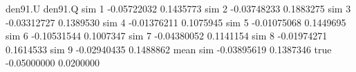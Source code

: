 \begin{Schunk}
\begin{Soutput}
             den91.U   den91.Q
sim 1    -0.05722032 0.1435773
sim 2    -0.03748233 0.1883275
sim 3    -0.03312727 0.1389530
sim 4    -0.01376211 0.1075945
sim 5    -0.01075068 0.1449695
sim 6    -0.10531544 0.1007347
sim 7    -0.04380052 0.1141154
sim 8    -0.01974271 0.1614533
sim 9    -0.02940435 0.1488862
mean sim -0.03895619 0.1387346
true     -0.05000000 0.0200000
\end{Soutput}
\end{Schunk}
